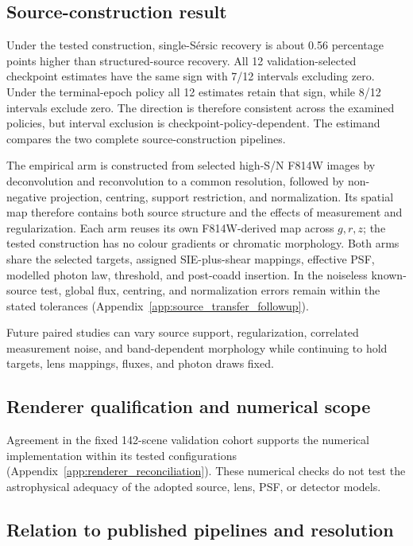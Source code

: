 \subsection{Source-construction result}
\label{sec:discussion_source}

Under the tested construction, single-S\'{e}rsic recovery is about
0.56 percentage points higher than structured-source recovery. All 12
validation-selected checkpoint estimates have the same sign with
7/12 intervals excluding zero. Under the terminal-epoch policy all 12 estimates
retain that sign, while 8/12 intervals exclude zero. The direction is
therefore consistent across the examined policies, but interval exclusion is
checkpoint-policy-dependent. The estimand compares the two complete
source-construction pipelines.

The empirical arm is constructed from selected high-S/N F814W images by
deconvolution and reconvolution to a common resolution, followed by
non-negative projection, centring, support restriction, and normalization.
Its spatial map therefore contains both source structure and the effects of
measurement and regularization. Each arm reuses its own F814W-derived map
across \(g,r,z\); the tested construction has no colour gradients or
chromatic morphology.
Both arms share the selected targets, assigned SIE-plus-shear mappings,
effective PSF, modelled photon law, threshold, and post-coadd insertion.
In the noiseless known-source test, global flux, centring, and normalization
errors remain within the stated tolerances
(Appendix~\ref{app:source_transfer_followup}).

Future paired studies can vary source support, regularization, correlated
measurement noise, and
band-dependent morphology while continuing to hold targets, lens mappings,
fluxes, and photon draws fixed.

\subsection{Renderer qualification and numerical scope}
\label{sec:discussion_renderer}

Agreement in the fixed 142-scene validation cohort supports the numerical
implementation within its tested configurations
(Appendix~\ref{app:renderer_reconciliation}). These numerical checks do not
test the astrophysical adequacy of the adopted source, lens, PSF, or detector
models.

\subsection{Relation to published pipelines and resolution}
\label{sec:discussion_literature}

